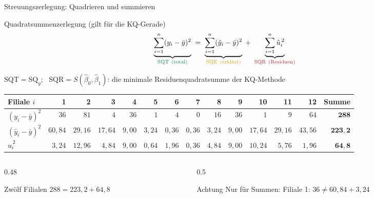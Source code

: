 \documentclass[aspectratio=169,11pt]{beamer}
\newcommand{\SQy}{\text{SQ}_y}
\begin{document}
\begin{frame}{Streuungszerlegung: Quadrieren und summieren}
  \begin{block}{Quadratsummenzerlegung (gilt für die KQ-Gerade)}
    \vspace{-1pt}
    \[
      \underbrace{\sum_{i=1}^{n} (y_i - \bar{y})^{2}}_{\color{hsbigreen}\text{SQT}\ \text{(total)}}
      \;=\;
      \underbrace{\sum_{i=1}^{n} (\hat{y}_i - \bar{y})^{2}}_{\color{hsbiaccent}\text{SQE}\ \text{(erklärt)}}
      \;+\;
      \underbrace{\sum_{i=1}^{n} \hat{u}_i^{\,2}}_{\color{resred}\text{SQR}\ \text{(Residuen)}}
    \]
    \vspace{-6pt}

    \footnotesize $\text{SQT} = \SQy$; \ $\text{SQR} = S(\hat{\beta}_0, \hat{\beta}_1)$:
    die minimale Residuenquadratsumme der KQ-Methode
  \end{block}

  \begin{center}
    \scriptsize
    \renewcommand{\arraystretch}{1.15}
    \setlength{\tabcolsep}{3.5pt}
    \begin{tabular}{l*{12}{r}r}
      \toprule
      Filiale $i$ & 1 & 2 & 3 & 4 & 5 & 6 & 7 & 8 & 9 & 10 & 11 & 12 & Summe \\
      \midrule
      {\color{hsbigreen}$(y_i - \bar{y})^{2}$}       & $36$ & $81$ & $4$ & $36$ & $1$ & $4$ & $0$ & $16$ & $36$ & $1$ & $9$ & $64$ & $\mathbf{288}$ \\
      {\color{hsbiaccent}$(\hat{y}_i - \bar{y})^{2}$} & $60{,}84$ & $29{,}16$ & $17{,}64$ & $9{,}00$ & $3{,}24$ & $0{,}36$ & $0{,}36$ & $3{,}24$ & $9{,}00$ & $17{,}64$ & $29{,}16$ & $43{,}56$ & $\mathbf{223{,}2}$ \\
      {\color{resred}$\hat{u}_i^{\,2}$}              & $3{,}24$ & $12{,}96$ & $4{,}84$ & $9{,}00$ & $0{,}64$ & $1{,}96$ & $0{,}36$ & $4{,}84$ & $9{,}00$ & $10{,}24$ & $5{,}76$ & $1{,}96$ & $\mathbf{64{,}8}$ \\
      \bottomrule
    \end{tabular}
  \end{center}

  \begin{columns}[T]
    \begin{column}{0.48\textwidth}
      \small
      \begin{exampleblock}{Zwölf Filialen}
        $288 = 223{,}2 + 64{,}8$ \quad\checkmark
      \end{exampleblock}
    \end{column}
    \begin{column}{0.5\textwidth}
      \small
      \begin{alertblock}{Achtung}
        Nur für Summen: Filiale 1: $36 \ne 60{,}84 + 3{,}24$
      \end{alertblock}
    \end{column}
  \end{columns}
\end{frame}
\end{document}
